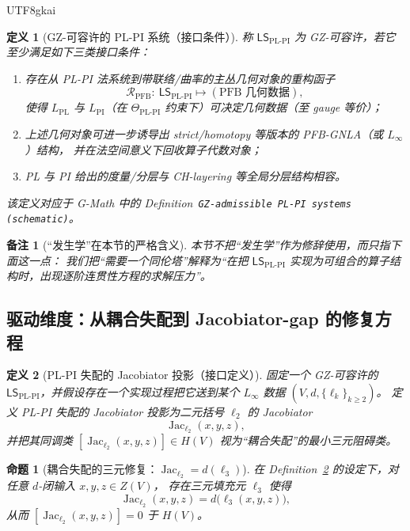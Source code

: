 \documentclass[12pt]{article}
\newtheorem{definition}{定义}[section]
\newtheorem{proposition}{命题}[section]
\newtheorem{remark}{备注}[section]
\newcommand{\Layer}{\ensuremath{\ell}}
\newcommand{\Jac}{\operatorname{Jac}}
\newcommand{\LSPLPI}{\ensuremath{\mathsf{LS}_{\mathrm{PL\text{-}PI}}}}
\newcommand{\LPL}{\ensuremath{L_{\mathrm{PL}}}}
\newcommand{\LPI}{\ensuremath{L_{\mathrm{PI}}}}
\newcommand{\ThetaPLPI}{\ensuremath{\Theta_{\mathrm{PL\text{-}PI}}}}
\begin{document}
\begin{CJK*}{UTF8}{gkai}
\begin{definition}[GZ-可容许的 PL-PI 系统（接口条件）]
\label{def:gz-admissible-plpi}
称 $\LSPLPI$ 为 \emph{GZ-可容许}，若它至少满足如下三类接口条件：
\begin{enumerate}
  \item 存在从 PL-PI 法系统到带联络/曲率的主丛几何对象的重构函子
        \[
          \mathcal{R}_{\mathrm{PFB}}:\ \LSPLPI \longmapsto (\text{PFB 几何数据}),
        \]
        使得 $\LPL$ 与 $\LPI$（在 $\ThetaPLPI$ 约束下）可决定几何数据（至 gauge 等价）；
  \item 上述几何对象可进一步诱导出 strict/homotopy 等版本的 PFB-GNLA（或 $L_\infty$）结构，
        并在法空间意义下回收算子代数对象；
  \item PL 与 PI 给出的度量/分层与 CH-layering 等全局分层结构相容。
\end{enumerate}
该定义对应于 G-Math\cite{GaoZheng2025GFramework} 中的 Definition~\texttt{GZ-admissible PL-PI systems (schematic)}。
\end{definition}

\begin{remark}[“发生学”在本节的严格含义]
本节不把“发生学”作为修辞使用，而只指下面这一点：
我们把“需要一个同伦塔”解释为“在把 $\LSPLPI$ 实现为可组合的算子结构时，出现逐阶连贯性方程的求解压力”。
\end{remark}

\subsection{驱动维度：从耦合失配到 Jacobiator-gap 的修复方程}

\begin{definition}[PL-PI 失配的 Jacobiator 投影（接口定义）]
\label{def:plpi-jacobiator-projection}
固定一个 GZ-可容许的 $\LSPLPI$，并假设存在一个实现过程把它送到某个 $L_\infty$ 数据
$(V,d,\{\Layer_k\}_{k\ge 2})$。
定义 \emph{PL-PI 失配的 Jacobiator 投影}为二元括号 $\Layer_2$ 的 Jacobiator
\[
  \Jac_{\Layer_2}(x,y,z),
\]
并把其同调类 $[\Jac_{\Layer_2}(x,y,z)]\in H(V)$ 视为“耦合失配”的最小三元阻碍类。
\end{definition}

\begin{proposition}[耦合失配的三元修复：$\Jac_{\Layer_2}=d(\Layer_3)$]
\label{prop:plpi-arity3-repair}
在 Definition~\ref{def:plpi-jacobiator-projection} 的设定下，对任意 $d$-闭输入 $x,y,z\in Z(V)$，
存在三元填充元 $\Layer_3$ 使得
\[
  \Jac_{\Layer_2}(x,y,z)=d\bigl(\Layer_3(x,y,z)\bigr),
\]
从而 $[\Jac_{\Layer_2}(x,y,z)]=0$ 于 $H(V)$。
\end{proposition}


\end{CJK*}
\end{document}
